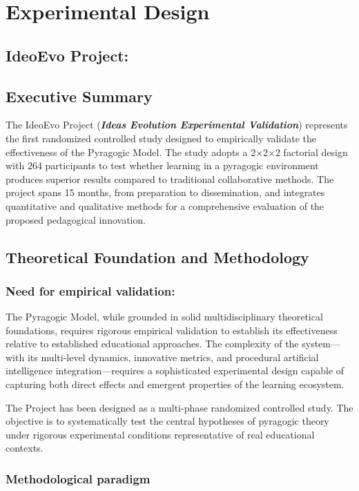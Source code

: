 \chapter{Experimental Design}
\section*{IdeoEvo Project:}
\label{chap:experimental-design}

\section*{Executive Summary}

The IdeoEvo Project (\textit{\textbf{Ideas Evolution Experimental Validation}}) represents the first randomized controlled study designed to empirically validate the effectiveness of the Pyragogic Model. The study adopts a 2×2×2 factorial design with 264 participants to test whether learning in a pyragogic environment produces superior results compared to traditional collaborative methods. The project spans 15 months, from preparation to dissemination, and integrates quantitative and qualitative methods for a comprehensive evaluation of the proposed pedagogical innovation.

\section{Theoretical Foundation and Methodology}
\subsection*{Need for empirical validation:}

The Pyragogic Model, while grounded in solid multidisciplinary theoretical foundations, requires rigorous empirical validation to establish its effectiveness relative to established educational approaches. The complexity of the system---with its multi-level dynamics, innovative metrics, and procedural artificial intelligence integration---requires a sophisticated experimental design capable of capturing both direct effects and emergent properties of the learning ecosystem.

The Project has been designed as a multi-phase randomized controlled study. The objective is to systematically test the central hypotheses of pyragogic theory under rigorous experimental conditions representative of real educational contexts.

\subsection{Methodological paradigm}

